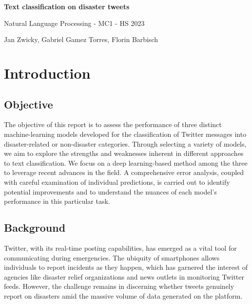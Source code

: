 \documentclass[10pt,table]{article}
\begin{document}
\begin{titlepage}
   \begin{center}
        \vspace{0.5cm}
        \begin{center}
        \end{center}
       \vspace*{1cm}
        \Huge
       \textbf{Text classification on disaster tweets}

       \vspace{0.5cm}
       Natural Language Processing - MC1 - HS 2023
            
       \vspace{1.5cm}

       Jan Zwicky, Gabriel Gamez Torres, Florin Barbisch

       \vfill
      
      \tiny
   \end{center}
\end{titlepage}
\tableofcontents
\newpage %


\section{Introduction}
\subsection{Objective}
The objective of this report is to assess the performance of three distinct machine-learning models developed for the classification of Twitter messages into disaster-related or non-disaster categories. Through selecting a variety of models, we aim to explore the strengths and weaknesses inherent in different approaches to text classification. We focus on a deep learning-based method among the three to leverage recent advances in the field. A comprehensive error analysis, coupled with careful examination of individual predictions, is carried out to identify potential improvements and to understand the nuances of each model's performance in this particular task.

\subsection{Background}
Twitter, with its real-time posting capabilities, has emerged as a vital tool for communicating during emergencies. The ubiquity of smartphones allows individuals to report incidents as they happen, which has garnered the interest of agencies like disaster relief organizations and news outlets in monitoring Twitter feeds. However, the challenge remains in discerning whether tweets genuinely report on disasters amid the massive volume of data generated on the platform.
\end{document}
